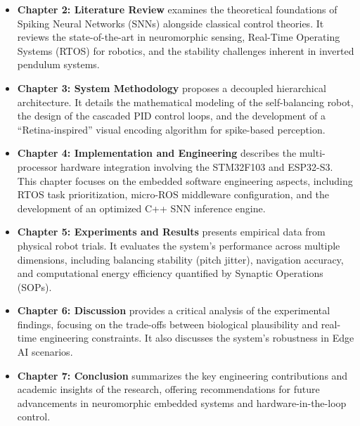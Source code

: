\begin{itemize}[leftmargin=*]

    \item \textbf{Chapter 2: Literature Review} examines the theoretical foundations of 
    Spiking Neural Networks (SNNs) alongside classical control theories. It reviews the 
    state-of-the-art in neuromorphic sensing, Real-Time Operating Systems (RTOS) for 
    robotics, and the stability challenges inherent in inverted pendulum systems.

    \item \textbf{Chapter 3: System Methodology} proposes a decoupled hierarchical architecture. 
    It details the mathematical modeling of the self-balancing robot, the design of the cascaded 
    PID control loops, and the development of a ``Retina-inspired'' visual encoding algorithm for 
    spike-based perception.

    \item \textbf{Chapter 4: Implementation and Engineering} describes the multi-processor hardware
     integration involving the STM32F103 and ESP32-S3. This chapter focuses on the embedded software 
     engineering aspects, including RTOS task prioritization, micro-ROS middleware configuration, and 
     the development of an optimized C++ SNN inference engine.

    \item \textbf{Chapter 5: Experiments and Results} presents empirical data from physical robot trials.
     It evaluates the system's performance across multiple dimensions, including balancing stability (pitch jitter),
      navigation accuracy, and computational energy efficiency quantified by Synaptic Operations (SOPs).

    \item \textbf{Chapter 6: Discussion} provides a critical analysis of the experimental findings, 
    focusing on the trade-offs between biological plausibility and real-time engineering constraints. 
    It also discusses the system's robustness in Edge AI scenarios.

    \item \textbf{Chapter 7: Conclusion} summarizes the key engineering contributions and academic insights
     of the research, offering recommendations for future advancements in neuromorphic embedded systems and 
     hardware-in-the-loop control.

\end{itemize}

